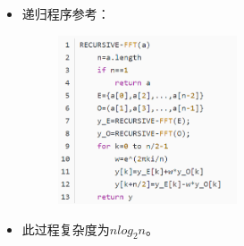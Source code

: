 \documentclass[UTF8]{article}%
\begin{document}
\begin{itemize}
    分治步骤：

    第一次：$x_0$、$x_2$、$x_4$、$x_6$；$x_1$、$x_3$、$x_5$、$x_7$ \qquad n=4

    第二次：$x_0$、$x_4$；$x_2$、$x_6$；$x_1$、$x_5$；$x_3$、$x_7$ \qquad n=2

    第三次：$x_0$；$x_4$；$x_2$；$x_6$；$x_1$；$x_5$；$x_3$；$x_7$ \qquad n=1

    回滚：

    最开始：$G_0=a_0$；$H_4=a_4$；$G_2=a_2$；$H_6=a_6$；$G_1=a_1$；$H_5=a_5$；$G_3=a_3$；$H_7=a_7$；\qquad n=1

    滚1次：$G_{04}=G_0+\omega(n)H_4$；$H_{26}=G_2+\omega(n)H_6$；$G_{15}=G_1+\omega(n)H_5$；$H_{37}=G_3+\omega(n)H_7$；\qquad n=2

    滚2次：$G_{0426}=G_{04}+\omega(n)H_{26}$；$G_{1537}=G_{15}+\omega(n)H_{37}$\qquad n=4

    滚3次：$Y=G_{0426}+\omega(n)H_{1537}$\qquad n=8

    得到了最终的y值。

    然后考虑纵向的回滚，记一开始为第0行：
    
    第一次：0->1\qquad n=2,m=1

    第二次：0->2,1->3\qquad n=4,m=2

    第三次：0->4,1->5,2->6,3->7 \qquad n=8,m=4

    最终求得了每一行的y值。

    注意：\textcolor{red}{除非最后一次(n)计算，其他次(n)的计算都是不完整的，因此每一个n下都需要重新计算所有的其余列。}

    \item 递归程序参考：
    
    {
        \begin{figure}[htb!]%
        \includegraphics[width=0.5\textwidth]{3-2.png}
        \end{figure}
    }
    
    \item 此过程复杂度为$nlog_2n$。
\end{itemize}
\end{document}
